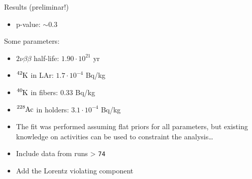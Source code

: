 \documentclass[10pt]{beamer}
\newcommand{\nbb}{\nu\beta\beta}
\begin{document}
\begin{frame}{Results (preliminar!)}
	\begin{itemize}
		\item p-value: $\sim0.3$
	\end{itemize}
	\alert{Some parameters}:
	\begin{itemize}
		\item $2\nbb$ half-life: $1.90\cdot10^{21}$ yr
		\item $\ce{^{42}K}$ in LAr: $1.7\cdot10^{-4}$ Bq/kg
		\item $\ce{^{40}K}$ in fibers: 0.33 Bq/kg
		\item $\ce{^{228}Ac}$ in holders: $3.1\cdot10^{-4}$ Bq/kg
	\end{itemize}
	\begin{itemize}
		\item The fit was performed assuming flat priors for all parameters, but existing knowledge on activities can be used to constraint the analysis\ldots
		\item Include data from runs > \texttt{74}
		\item Add the Lorentz violating component
	\end{itemize}
\end{frame}
\end{document}
